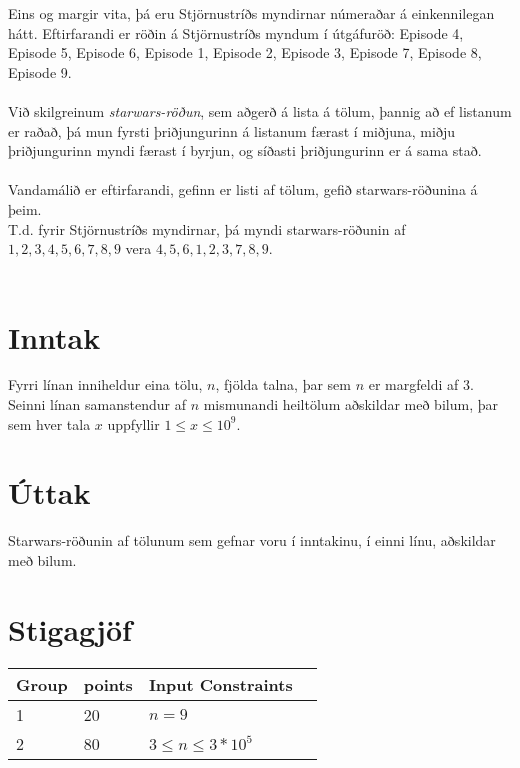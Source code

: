 Eins og margir vita, þá eru Stjörnustríðs myndirnar númeraðar á einkennilegan hátt. Eftirfarandi er röðin á Stjörnustríðs myndum í útgáfuröð:
Episode 4, Episode 5, Episode 6, Episode 1, Episode 2, Episode 3, Episode 7, Episode 8, Episode 9.\\\\
Við skilgreinum \textit{starwars-röðun}, sem aðgerð á lista á tölum, þannig að ef listanum er raðað, þá mun fyrsti þriðjungurinn á listanum færast í miðjuna, miðju þriðjungurinn myndi færast í byrjun, og síðasti þriðjungurinn er á sama stað.\\\\
Vandamálið er eftirfarandi, gefinn er listi af tölum, gefið starwars-röðunina á þeim.\\T.d. fyrir Stjörnustríðs myndirnar, þá myndi starwars-röðunin af $1, 2, 3, 4, 5, 6, 7, 8, 9$ vera $4, 5, 6, 1, 2, 3, 7, 8, 9$.\\\\


\section*{Inntak}
Fyrri línan inniheldur eina tölu, $n$, fjölda talna, þar sem $n$ er margfeldi af $3$.
Seinni línan samanstendur af $n$ mismunandi heiltölum aðskildar með bilum, þar sem hver tala $x$ uppfyllir $1 \leq x \leq 10^9$.

\section*{Úttak}
Starwars-röðunin af tölunum sem gefnar voru í inntakinu, í einni línu, aðskildar með bilum.

\section*{Stigagjöf}
\begin{tabular}{|l|l|l|l|}
\hline
Group & points & Input Constraints \\ \hline
1     & 20     & $n = 9$ \\ \hline
2     & 80     & $3 \leq n \leq 3*10^5$ \\ \hline
\end{tabular}
